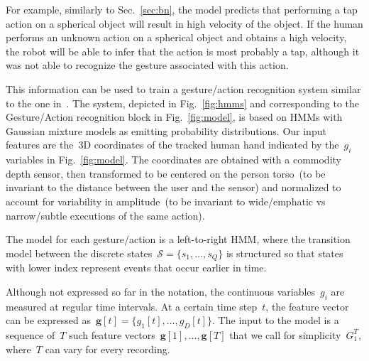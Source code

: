 For example, similarly to Sec.~\ref{sec:bn}, the \AffWords{} model predicts that performing a tap action on a spherical object will result in high velocity of the object.
If the human performs an unknown action on a spherical object and obtains a high velocity, the robot will be able to infer that the action is most probably a tap, although it was not able to recognize the gesture associated with this action.

This information can be used to train a gesture/action recognition system similar to the one in~\cite{saponaro:2013:crhri}.
The system, depicted in Fig.~\ref{fig:hmms} and corresponding to the Gesture/Action recognition block in Fig.~\ref{fig:model}, is based on \acp{HMM} with Gaussian mixture models as emitting probability distributions.
Our input features are the~3D coordinates of the tracked human hand indicated by the~$g_i$ variables in Fig.~\ref{fig:model}.
The coordinates are obtained with a commodity depth sensor, then transformed to be centered on the person torso~(to be invariant to the distance between the user and the sensor) and normalized to account for variability in amplitude~(to be invariant to wide/emphatic vs narrow/subtle executions of the same action).

The model for each gesture/action is a
left-to-right \ac{HMM}, where the transition model between the discrete states~$\mathcal{S} = \{s_1, \dots, s_Q\}$ is structured so that states with lower index represent events that occur earlier in time.

Although not expressed so far in the notation, the continuous variables~$g_i$ are measured at regular time intervals.
At a certain time step~$t$, the feature vector can be expressed as~$\bm{g}[t] = \{g_1[t], \dots, g_D[t]\}$.
The input to the model is a sequence of~$T$ such feature vectors~$\bm{g}[1], \dots, \bm{g}[T]$ that we call for simplicity~$G_1^T$, where~$T$ can vary for every recording.

